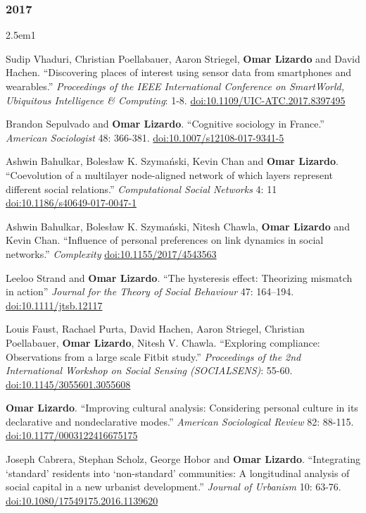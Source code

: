\documentclass[
]{article}
\newenvironment{cventry}{\begin{hangparas}{2.5em}{1}}{\end{hangparas}}
\begin{document}
\subsubsection{2017}\label{section-5}

\begin{cventry}

Sudip Vhaduri, Christian Poellabauer, Aaron Striegel, \textbf{Omar
Lizardo} and David Hachen. ``Discovering places of interest using sensor
data from smartphones and wearables.'' \emph{Proceedings of the IEEE
International Conference on SmartWorld, Ubiquitous Intelligence \&
Computing}: 1-8.
\href{https://doi.org/10.1109/UIC-ATC.2017.8397495}{doi:10.1109/UIC-ATC.2017.8397495}

Brandon Sepulvado and \textbf{Omar Lizardo}. ``Cognitive sociology in
France.'' \emph{American Sociologist} 48: 366-381.
\href{https://doi.org/10.1007/s12108-017-9341-5}{doi:10.1007/s12108-017-9341-5}

Ashwin Bahulkar, Bolesław K. Szymański, Kevin Chan and \textbf{Omar
Lizardo}. ``Coevolution of a multilayer node-aligned network of which
layers represent different social relations.'' \emph{Computational
Social Networks} 4: 11
\href{https://doi.org/10.1186/s40649-017-0047-1}{doi:10.1186/s40649-017-0047-1}

Ashwin Bahulkar, Bolesław K. Szymański, Nitesh Chawla, \textbf{Omar
Lizardo} and Kevin Chan. ``Influence of personal preferences on link
dynamics in social networks.'' \emph{Complexity}
\href{https://doi.org/10.1155/2017/4543563}{doi:10.1155/2017/4543563}

Leeloo Strand and \textbf{Omar Lizardo}. ``The hysteresis effect:
Theorizing mismatch in action'' \emph{Journal for the Theory of Social
Behaviour} 47: 164--194.
\href{https://doi.org/10.1111/jtsb.12117}{doi:10.1111/jtsb.12117}

Louis Faust, Rachael Purta, David Hachen, Aaron Striegel, Christian
Poellabauer, \textbf{Omar Lizardo}, Nitesh V. Chawla. ``Exploring
compliance: Observations from a large scale Fitbit study.''
\emph{Proceedings of the 2nd International Workshop on Social Sensing
(SOCIALSENS)}: 55-60.
\href{https://doi.org/10.1145/3055601.3055608}{doi:10.1145/3055601.3055608}

\textbf{Omar Lizardo}. ``Improving cultural analysis: Considering
personal culture in its declarative and nondeclarative modes.''
\emph{American Sociological Review} 82: 88-115.
\href{https://doi.org/10.1177/0003122416675175}{doi:10.1177/0003122416675175}

Joseph Cabrera, Stephan Scholz, George Hobor and \textbf{Omar Lizardo}.
``Integrating `standard' residents into `non-standard' communities: A
longitudinal analysis of social capital in a new urbanist development.''
\emph{Journal of Urbanism} 10: 63-76.
\href{https://doi.org/10.1080/17549175.2016.1139620}{doi:10.1080/17549175.2016.1139620}

\end{cventry}
\end{document}
